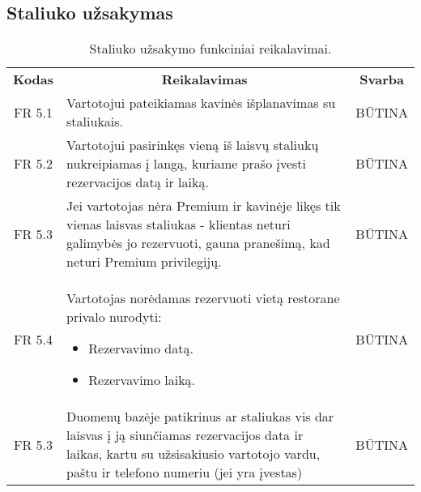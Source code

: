 \documentclass{VUMIFPSkursinis}
\begin{document}
\pagebreak


\subsection{Staliuko užsakymas}
\begin{center}
	\begin{table}[H]
	\begin{tabular}{|p{2cm}|p{}|p{}|}
	
	\hline
	    \rowcolor{lightgray}
		\multicolumn{3}{|c|}{Staliuko užsakymas}\\
		
	\hline
		\multicolumn{1}{|c|}{{\bfseries Kodas}}&
		\multicolumn{1}{|c|}{{\bfseries Reikalavimas}}&
		\multicolumn{1}{|c|}{{\bfseries Svarba}}\\

	\hline
	
		\multicolumn{1}{|c|}{FR 5.1}&
		{Vartotojui pateikiamas kavinės išplanavimas su staliukais.}&
		\multicolumn{1}{|c|}{BŪTINA}\\				
	\hline
	
		\multicolumn{1}{|c|}{FR 5.2}&
		{Vartotojui pasirinkęs vieną iš laisvų staliukų nukreipiamas į langą, kuriame prašo įvesti rezervacijos datą ir laiką.}&
		\multicolumn{1}{|c|}{BŪTINA}\\				
	\hline
	
		\multicolumn{1}{|c|}{FR 5.3}&
		{Jei vartotojas nėra Premium ir kavinėje likęs tik vienas laisvas staliukas - klientas neturi galimybės jo rezervuoti, gauna pranešimą, kad neturi Premium privilegijų.}&
		\multicolumn{1}{|c|}{BŪTINA}\\				
	\hline
	
		\multicolumn{1}{|c|}{FR 5.4}&
		{Vartotojas norėdamas rezervuoti vietą restorane privalo nurodyti:
			\begin{itemize}
				\item Rezervavimo datą.
				\item Rezervavimo laiką.
			\end{itemize}}&
			\multicolumn{1}{|c|}{BŪTINA}\\				
	\hline
	
		\multicolumn{1}{|c|}{FR 5.3}&
		{Duomenų bazėje patikrinus ar staliukas vis dar laisvas į ją siunčiamas rezervacijos data ir laikas, kartu su užsisakiusio vartotojo vardu, paštu ir telefono numeriu (jei yra įvestas)}&
		\multicolumn{1}{|c|}{BŪTINA}\\				
	\hline
	
			
	
	\end{tabular}		
	\caption{Staliuko užsakymo funkciniai reikalavimai.}
	\label{table:StaliukoUžsakymas}
	\end{table}


\end{center}
\end{document}
